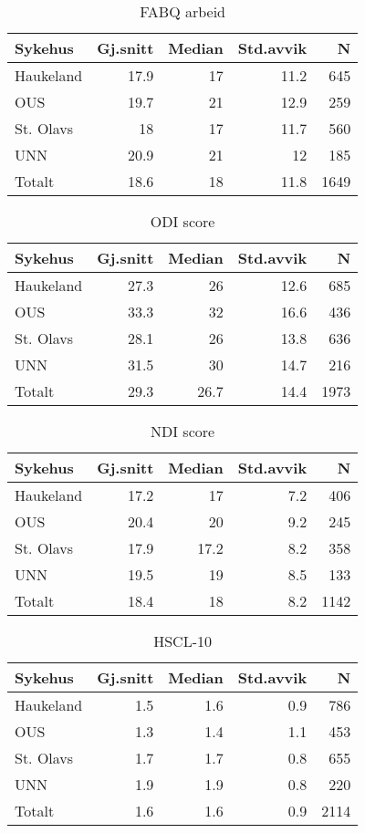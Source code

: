\documentclass[norsk,a4paper]{article}\usepackage[]{graphicx}\usepackage[]{color}
\begin{document}
\begin{table}[ht]
\centering
\begin{tabular}{lrrrr}
  \hline
Sykehus & Gj.snitt & Median & Std.avvik & N \\ 
  \hline
Haukeland & 17.9 & 17 & 11.2 & 645 \\ 
  OUS & 19.7 & 21 & 12.9 & 259 \\ 
  St. Olavs & 18 & 17 & 11.7 & 560 \\ 
  UNN & 20.9 & 21 & 12 & 185 \\ 
  Totalt & 18.6 & 18 & 11.8 & 1649 \\ 
   \hline
\end{tabular}
\caption{FABQ arbeid} 
\end{table}
\begin{table}[ht]
\centering
\begin{tabular}{lrrrr}
  \hline
Sykehus & Gj.snitt & Median & Std.avvik & N \\ 
  \hline
Haukeland & 27.3 & 26 & 12.6 & 685 \\ 
  OUS & 33.3 & 32 & 16.6 & 436 \\ 
  St. Olavs & 28.1 & 26 & 13.8 & 636 \\ 
  UNN & 31.5 & 30 & 14.7 & 216 \\ 
  Totalt & 29.3 & 26.7 & 14.4 & 1973 \\ 
   \hline
\end{tabular}
\caption{ODI score} 
\end{table}
\begin{table}[ht]
\centering
\begin{tabular}{lrrrr}
  \hline
Sykehus & Gj.snitt & Median & Std.avvik & N \\ 
  \hline
Haukeland & 17.2 & 17 & 7.2 & 406 \\ 
  OUS & 20.4 & 20 & 9.2 & 245 \\ 
  St. Olavs & 17.9 & 17.2 & 8.2 & 358 \\ 
  UNN & 19.5 & 19 & 8.5 & 133 \\ 
  Totalt & 18.4 & 18 & 8.2 & 1142 \\ 
   \hline
\end{tabular}
\caption{NDI score} 
\end{table}
\begin{table}[ht]
\centering
\begin{tabular}{lrrrr}
  \hline
Sykehus & Gj.snitt & Median & Std.avvik & N \\ 
  \hline
Haukeland & 1.5 & 1.6 & 0.9 & 786 \\ 
  OUS & 1.3 & 1.4 & 1.1 & 453 \\ 
  St. Olavs & 1.7 & 1.7 & 0.8 & 655 \\ 
  UNN & 1.9 & 1.9 & 0.8 & 220 \\ 
  Totalt & 1.6 & 1.6 & 0.9 & 2114 \\ 
   \hline
\end{tabular}
\caption{HSCL-10} 
\end{table}
\end{document}

